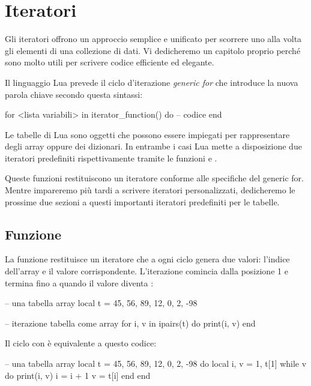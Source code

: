 
\chapter{Iteratori}
\label{chFondIteratori}

Gli iteratori offrono un approccio semplice e unificato per scorrere uno alla
volta gli elementi di una collezione di dati. Vi dedicheremo un capitolo proprio
perché sono molto utili per scrivere codice efficiente ed elegante.

Il linguaggio Lua prevede il ciclo d'iterazione \emph{generic for} che
introduce la nuova parola chiave  secondo questa sintassi:
\begin{lines}
for <lista variabili> in iterator_function() do
-- codice
end
\end{lines}

Le tabelle di Lua sono oggetti che possono essere impiegati per rappresentare
degli array oppure dei dizionari. In entrambe i casi Lua mette a disposizione
due iteratori predefiniti rispettivamente tramite le funzioni
 e .

Queste funzioni restituiscono un iteratore conforme alle specifiche del generic
for. Mentre impareremo più tardi a scrivere iteratori personalizzati,
dedicheremo le prossime due sezioni a questi importanti iteratori predefiniti
per le tabelle.


\section{Funzione }

La funzione  restituisce un iteratore che a ogni ciclo genera due
valori: l'indice dell'array e il valore corrispondente. L'iterazione comincia
dalla posizione 1 e termina fino a quando il valore diventa :
\begin{lines}
-- una tabella array
local t = {45, 56, 89, 12, 0, 2, -98}

-- iterazione tabella come array
for i, v in ipairs(t) do
    print(i, v)
end
\end{lines}

Il ciclo con  è equivalente a questo codice:
\begin{lines}
-- una tabella array
local t = {45, 56, 89, 12, 0, 2, -98}
do
    local i, v = 1, t[1]
    while v do
        print(i, v)
        i = i + 1
        v = t[i]
    end
end
\end{lines}

